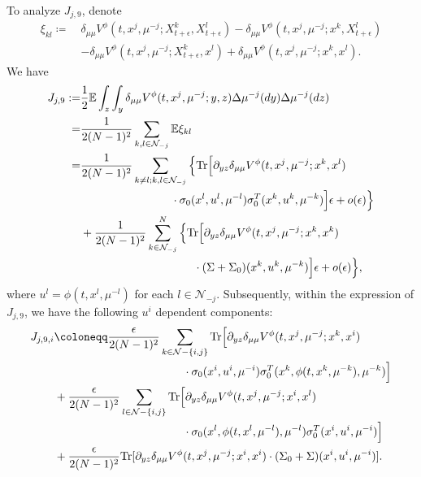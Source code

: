 \documentclass{amsart}
\theoremstyle{definition}
\theoremstyle{remark}
\def\cal{\mathcal}
\def\EE{{\mathbb E}}
\def\deltae{\epsilon}
\numberwithin{equation}{section}
\begin{document}
To analyze $J_{j,9}$,
denote
\begin{align*}
\xi_{kl} \coloneqq \ &
\delta_{\mu\mu} V^\phi (t, x^j, \mu^{-j}; X_{t+\deltae}^k,X_{t+\deltae}^l)-\delta_{\mu\mu} V^\phi (t, x^j, \mu^{-j}; x^k,X_{t+\deltae}^l) \\
&-\delta_{\mu\mu} V^\phi (t, x^j, \mu^{-j}; X_{t+\deltae}^k,x^l)+\delta_{\mu\mu} V^\phi (t, x^j, \mu^{-j}; x^k,x^l) .
\end{align*}
We have
\begin{align*}
J_{j,9}:= &\frac{1}{2}\EE\int_z\int_y \delta_{\mu\mu} V^\phi (t, x^j, \mu^{-j}; y,z)\Delta \mu^{-j} (dy) \Delta\mu^{-j} (dz)  \\
= & \frac{1}{2(N-1)^2}
\sum_{ k,l\in {\mathcal N}_{-j} } \EE \xi_{kl}\\
\hskip -1cm =&\frac{1}{2(N-1)^2} \sum_{ k\ne l; k, l\in{\mathcal N}_{-j} }
\Big\{{\rm Tr}\Big[\partial_{yz}\delta_{\mu\mu} V^\phi (t, x^j, \mu^{-j}; x^k,x^l)\\
&\qquad\qquad\qquad\qquad \cdot \sigma_0(x^l,u^l,\mu^{-l})
\sigma_0^T(x^k,u^k,\mu^{-k})\Big]\deltae+o(\deltae)\Big\}\\
& + \frac{1}{2(N-1)^2} \sum_{ k\in {\mathcal N}_{-j} }^N
\Big\{{\rm Tr}\Big[\partial_{yz}\delta_{\mu\mu} V^\phi (t, x^j, \mu^{-j}; x^k,x^k)\\
&\qquad\qquad\qquad\qquad\qquad \cdot(\Sigma+ \Sigma_0)(x^k,u^k,\mu^{-k})\Big]
\deltae+o(\deltae)\Big\},
\end{align*}
where   $u^l=\phi(t,x^l, \mu^{-l})$ for each $l\in {\cal N}_{-j}$.
Subsequently, within the expression of $J_{j,9}$,
we have the following $u^i$ dependent components:
\begin{align*}
 J_{j,9,i}&\coloneqq
\frac{\deltae}{2(N-1)^2} \sum_{ k\in {\cal N} - \{i,j\} }
{\rm Tr}\Big[\partial_{yz}\delta_{\mu\mu} V^\phi (t, x^j, \mu^{-j}; x^k,x^i) \\
&\hskip 4cm \cdot \sigma_0(x^i,u^i,\mu^{-i})\sigma_0^T(x^k,\phi(t,x^k,\mu^{-k}),\mu^{-k})
\Big]\\
&+ \frac{\deltae}{2(N-1)^2} \sum_{l \in{\mathcal N} - \{i,j\} }
{\rm Tr}\Big[\partial_{yz}\delta_{\mu\mu} V^\phi (t, x^j, \mu^{-j}; x^i,x^l) \\&\hskip 4cm\cdot \sigma_0(x^l,\phi(t,x^l,\mu^{-l}),\mu^{-l})\sigma_0^T(x^i,u^i,\mu^{-i})
\Big]\\
&+ \frac{\deltae}{2(N-1)^2} {\rm Tr}[\partial_{yz}\delta_{\mu\mu} V^\phi (t, x^j, \mu^{-j}; x^i,x^i) \cdot (\Sigma_0+\Sigma)(x^i,u^i,\mu^{-i})].
 \\
\end{align*}
\end{document}
